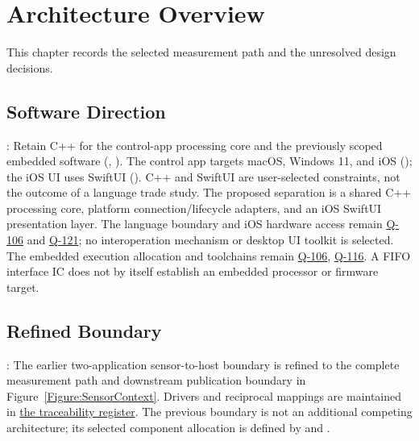 \chapter{Architecture Overview}
\label{Section:ArchitectureOverviewResponsibility}
This chapter records the selected measurement path and the unresolved design decisions.


\section{Software Direction}
: Retain C++ for the control-app processing core and the previously scoped embedded software (, ). The control app targets macOS, Windows 11, and iOS (); the iOS UI uses SwiftUI (). C++ and SwiftUI are user-selected constraints, not the outcome of a language trade study. The proposed separation is a shared C++ processing core, platform connection/lifecycle adapters, and an iOS SwiftUI presentation layer. The language boundary and iOS hardware access remain \hyperref[Question:Q-106]{Q-106} and \hyperref[Question:Q-121]{Q-121}; no interoperation mechanism or desktop UI toolkit is selected. The embedded execution allocation and toolchains remain \hyperref[Question:Q-106]{Q-106}, \hyperref[Question:Q-116]{Q-116}. A FIFO interface IC does not by itself establish an embedded processor or firmware target.

\section{Refined Boundary}
: The earlier two-application sensor-to-host boundary is refined to the complete measurement path and downstream publication boundary in Figure~\ref{Figure:SensorContext}. Drivers and reciprocal mappings are maintained in \hyperref[Table:TraceabilityMatrix]{the traceability register}. The previous boundary is not an additional competing architecture; its selected component allocation is defined by  and .

